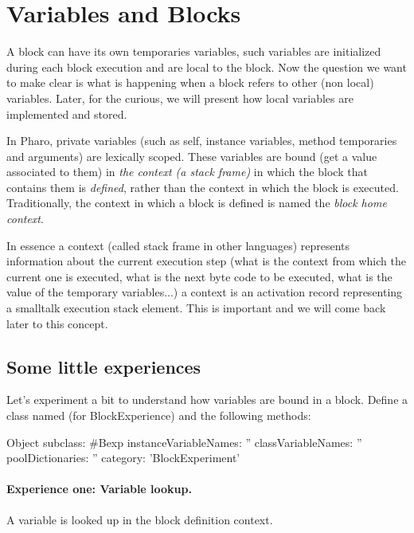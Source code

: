 \documentclass[a4paper,10pt,twoside]{book}
\begin{document}
\section{Variables and Blocks}
A block can have its own temporaries variables, such variables are initialized during each block execution and are local to the block. Now the question we want to make clear is what is happening when a block refers to other (non local) variables. Later, for the curious, we will present how local variables are implemented and stored.

In Pharo, private variables (such as self, instance variables, method temporaries and arguments) are lexically scoped. These variables are bound (get a value associated to them) in \emph{the context (a stack frame)} in which the block that contains them is \emph{defined}, rather than the context in which the block is executed.  Traditionally, the context in which a block is defined is named the \emph{block home context}.

In essence a context (called stack frame in other languages) represents information about the current execution step (what is the context from which the current one is executed, what is the next byte code to be executed, what is the value of the temporary variables...) a context is an activation record representing a smalltalk execution stack element. This is important and we will come back later to this concept.

\subsection{Some little experiences}

Let's experiment a bit to understand how variables are bound in a block. Define a class named  (for BlockExperience) and the following methods:

\begin{code}{}
Object subclass: #Bexp
	instanceVariableNames: ''
	classVariableNames: ''
	poolDictionaries: ''
	category: 'BlockExperiment'
\end{code}

\paragraph{Experience one: Variable lookup.} A variable is looked up in the block definition context.
\end{document}

